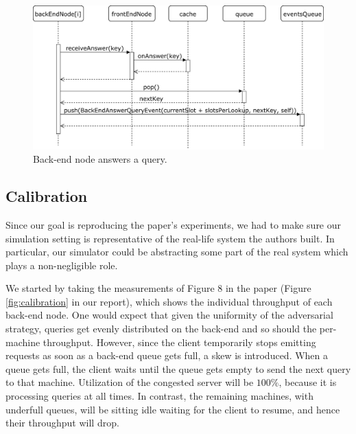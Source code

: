 \documentclass[10pt,letterpaper]{article}
\begin{document}
\begin{figure}
	\centering
	\includegraphics[scale=0.75]{img/answer_query.pdf}
	\caption{Back-end node answers a query.}
	\label{fig:answer_query}
\end{figure}

\subsection{Calibration}

Since our goal is reproducing the paper's experiments, we had to make sure our simulation setting is representative of the real-life system the authors built. In particular, our simulator could be abstracting some part of the real system which plays a non-negligible role.

We started by taking the measurements of Figure 8 in the paper (Figure \ref{fig:calibration} in our report), which shows the individual throughput of each back-end node. One would expect that given the uniformity of the adversarial strategy, queries get evenly distributed on the back-end and so should the per-machine throughput. However, since the client temporarily stops emitting requests as soon as a back-end queue gets full, a skew is introduced. When a queue gets full, the client waits until the queue gets empty to send the next query to that machine. Utilization of the congested server will be $100\%$, because it is processing queries at all times. In contrast, the remaining machines, with underfull queues, will be sitting idle waiting for the client to resume, and hence their throughput will drop.
\end{document}
